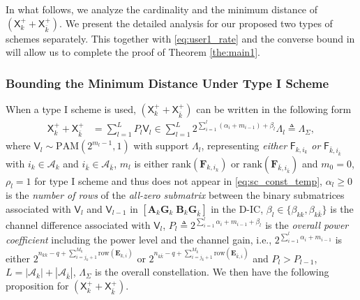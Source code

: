 \documentclass[12pt, draftclsnofoot, onecolumn]{IEEEtran}
\newcommand{\msf}[1]{\mathsf{#1}}
\theoremstyle{definition}
\begin{document}
In what follows, we analyze the cardinality and the minimum distance of $(\msf{X}^{+}_k+\msf{X}^{+}_{\bar{k}})$. We present the detailed analysis for our proposed two types of schemes separately. This together with \eqref{eq:user1_rate} and the converse bound in \cite{4675741} will allow us to complete the proof of Theorem \ref{the:main1}.





\subsubsection{Bounding the Minimum Distance Under Type I Scheme}\label{sec:tyep1_dmin}
When a type I scheme is used, $(\msf{X}^{+}_k+\msf{X}^{+}_{\bar{k}})$ can be written in the following form
\begin{align}\label{eq:sc_const_temp}
\msf{X}^{+}_k+\msf{X}^{+}_{\bar{k}}&= \sum_{l=1}^LP_l\msf{V}_l %
 \in \sum_{l=1}^L 2^{\sum_{i=1}^l(\alpha_i+m_{i-1})+\beta_l}\Lambda_l\triangleq \Lambda_{\Sigma}, %
\end{align}
where $\msf{V}_l\sim \text{PAM}(2^{m_l-1},1)$ with support $\Lambda_l$, representing \emph{either} $\msf{F}_{k,i_k}$ \emph{or} $\msf{F}_{\bar{k},i_{\bar{k}}}$ with $i_k \in \mathcal{A}_k$ and $i_{\bar{k}} \in \mathcal{A}_{\bar{k}}$, $m_l$ is either $\text{rank}(\boldsymbol{F}_{k,i_k})$ or $\text{rank}(\boldsymbol{F}_{\bar{k},i_{\bar{k}}})$ and $m_0 = 0$, $\rho_l=1$ for type I scheme and thus does not appear in \eqref{eq:sc_const_temp}, $\alpha_l \geq 0$ is the \emph{number of rows} of the \emph{all-zero submatrix} between the binary submatrices associated with $\msf{V}_l$ and $\msf{V}_{l-1}$ in $[\boldsymbol{A}_k\boldsymbol{G}_k \; \boldsymbol{B}_k\boldsymbol{G}_{\bar{k}}]$ in the D-IC, $\beta_l \in \{\beta_{kk},\beta_{k\bar{k}}\}$ is the channel difference associated with $\msf{V}_l$, $P_l \triangleq 2^{\sum_{i=1}^l\alpha_i+m_{i-1}+\beta_l}$ is the \emph{overall power coefficient} including the power level and the channel gain, i.e., $2^{\sum_{i=1}^l\alpha_i+m_{i-1}}$ is either $2^{n_{kk}-q+\sum_{i=j_k+1}^{M_k}\text{row}(\boldsymbol{E}_{k,i})}$ or $2^{n_{k\bar{k}}-q+\sum_{i=j_{\bar{k}}+1}^{M_{\bar{k}}}\text{row}(\boldsymbol{E}_{{\bar{k}},i})}$ and $P_l >P_{l-1}$, $L=|\mathcal{A}_k|+|\mathcal{A}_{\bar{k}}|$, $\Lambda_{\Sigma}$ is the overall constellation. We then have the following proposition for $(\msf{X}^{+}_k+\msf{X}^{+}_{\bar{k}})$.
\end{document}
